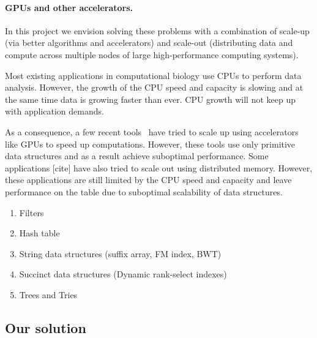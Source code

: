 \paragraph{GPUs and other accelerators.}

In this project we envision solving these problems with a combination of  scale-up (via better algorithms and accelerators) and scale-out (distributing data and compute across multiple nodes of large high-performance computing systems).


Most existing applications in computational biology use CPUs to perform data  analysis. 
However, the growth of the CPU speed and capacity is slowing and at the same time data is growing faster than ever. CPU growth will not keep up with application demands.

As a consequence, a few recent tools~\cite{cite-something} have tried to scale
up using accelerators like GPUs to speed up computations. However, these tools
use only primitive data structures and as a result achieve suboptimal
performance. Some applications [cite] have also tried to scale out using
distributed memory.  However, these applications are still limited by the CPU
speed and capacity and leave performance on the table due to suboptimal
scalability of data structures.





\begin{enumerate}[noitemsep, leftmargin=*]
  \item Filters
  \item Hash table
  \item String data structures (suffix array, FM index, BWT)
  \item Succinct data structures (Dynamic rank-select indexes)
  \item Trees and Tries
\end{enumerate}

\subsection{Our solution}

